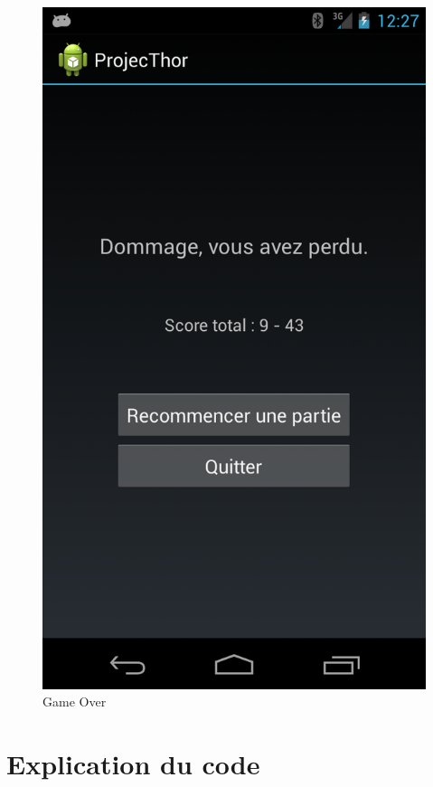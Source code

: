 \begin{figure}
	\begin{minipage}{0.45\textwidth}
		\caption{Game Over}
		\label{view_6}
		\center
		\includegraphics[scale=0.2]{view_6.png}
	\end{minipage}

\end{figure}

\section{Explication du code}

